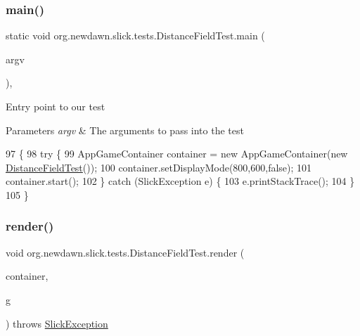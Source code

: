 \subsubsection{\texorpdfstring{main()}{main()}}
{\footnotesize\ttfamily static void org.\+newdawn.\+slick.\+tests.\+Distance\+Field\+Test.\+main (\begin{DoxyParamCaption}\item[{String \mbox{[}$\,$\mbox{]}}]{argv }\end{DoxyParamCaption})\hspace{0.3cm}{\ttfamily [inline]}, {\ttfamily [static]}}

Entry point to our test


\begin{DoxyParams}{Parameters}
{\em argv} & The arguments to pass into the test \\
\hline
\end{DoxyParams}

\begin{DoxyCode}
97                                            \{
98         \textcolor{keywordflow}{try} \{
99             AppGameContainer container = \textcolor{keyword}{new} AppGameContainer(\textcolor{keyword}{new} 
      \mbox{\hyperlink{classorg_1_1newdawn_1_1slick_1_1tests_1_1_distance_field_test_ad3b228a30e9c9e57f56af37e0c44cf04}{DistanceFieldTest}}());
100             container.setDisplayMode(800,600,\textcolor{keyword}{false});
101             container.start();
102         \} \textcolor{keywordflow}{catch} (SlickException e) \{
103             e.printStackTrace();
104         \}
105     \}
\end{DoxyCode}
\mbox{\label{classorg_1_1newdawn_1_1slick_1_1tests_1_1_distance_field_test_a4ea78be9228beb985a86a6cf01d14795}} 
\subsubsection{\texorpdfstring{render()}{render()}}
{\footnotesize\ttfamily void org.\+newdawn.\+slick.\+tests.\+Distance\+Field\+Test.\+render (\begin{DoxyParamCaption}\item[{\mbox{\hyperlink{classorg_1_1newdawn_1_1slick_1_1_game_container}{Game\+Container}}}]{container,  }\item[{\mbox{\hyperlink{classorg_1_1newdawn_1_1slick_1_1_graphics}{Graphics}}}]{g }\end{DoxyParamCaption}) throws \mbox{\hyperlink{classorg_1_1newdawn_1_1slick_1_1_slick_exception}{Slick\+Exception}}\hspace{0.3cm}{\ttfamily [inline]}}

